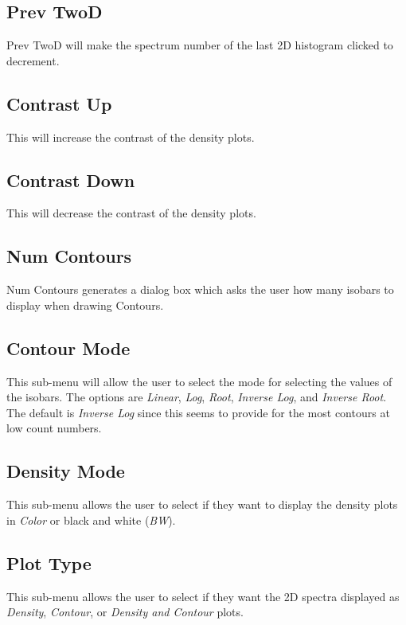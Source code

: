 \subsection{Prev TwoD}

Prev TwoD will make the spectrum number of the last 2D histogram clicked to decrement.

\subsection{Contrast Up}

This will increase the contrast of the density plots.

\subsection{Contrast Down}

This will decrease the contrast of the density plots.

\subsection{Num Contours}

Num Contours generates a dialog box which asks the user how many isobars to display when drawing Contours.

\subsection{Contour Mode}

This sub-menu will allow the user to select the mode for selecting the values of the isobars.  The options are {\it Linear}, {\it Log}, {\it Root}, {\it Inverse Log}, and {\it Inverse Root}.  The default is {\it Inverse Log} since this seems to provide for the most contours at low count numbers.  
\subsection{Density Mode}

This sub-menu allows the user to select if they want to display the density plots in {\it Color} or black and white ({\it BW}).

\subsection{Plot Type}

This sub-menu allows the user to select if they want the 2D spectra displayed as {\it Density}, {\it Contour}, or {\it Density and Contour} plots.

